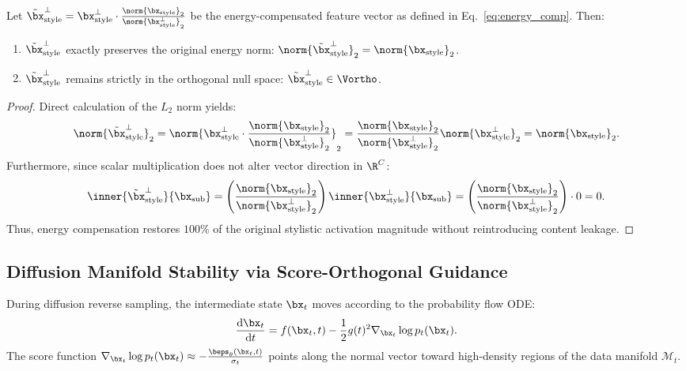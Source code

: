 \begin{theorem}
\label{thm:energy}
Let $\tilde{\bx}_{\text{style}}^\perp = \bx_{\text{style}}^\perp \cdot \frac{\norm{\bx_{\text{style}}}_2}{\norm{\bx_{\text{style}}^\perp}_2}$ be the energy-compensated feature vector as defined in Eq.~\eqref{eq:energy_comp}. Then:
\begin{enumerate}
    \item $\tilde{\bx}_{\text{style}}^\perp$ exactly preserves the original energy norm: $\norm{\tilde{\bx}_{\text{style}}^\perp}_2 = \norm{\bx_{\text{style}}}_2$.
    \item $\tilde{\bx}_{\text{style}}^\perp$ remains strictly in the orthogonal null space: $\tilde{\bx}_{\text{style}}^\perp \in \Vortho$.
\end{enumerate}
\end{theorem}

\begin{proof}
Direct calculation of the $L_2$ norm yields:
\begin{equation}
    \norm{\tilde{\bx}_{\text{style}}^\perp}_2 = \norm{ \bx_{\text{style}}^\perp \cdot \frac{\norm{\bx_{\text{style}}}_2}{\norm{\bx_{\text{style}}^\perp}_2} }_2 = \frac{\norm{\bx_{\text{style}}}_2}{\norm{\bx_{\text{style}}^\perp}_2} \norm{\bx_{\text{style}}^\perp}_2 = \norm{\bx_{\text{style}}}_2.
\end{equation}
Furthermore, since scalar multiplication does not alter vector direction in $\R^C$:
\begin{equation}
    \inner{\tilde{\bx}_{\text{style}}^\perp}{\bx_{\text{sub}}} = \left( \frac{\norm{\bx_{\text{style}}}_2}{\norm{\bx_{\text{style}}^\perp}_2} \right) \inner{\bx_{\text{style}}^\perp}{\bx_{\text{sub}}} = \left( \frac{\norm{\bx_{\text{style}}}_2}{\norm{\bx_{\text{style}}^\perp}_2} \right) \cdot 0 = 0.
\end{equation}
Thus, energy compensation restores $100\%$ of the original stylistic activation magnitude without reintroducing content leakage.
\end{proof}

\subsection{Diffusion Manifold Stability via Score-Orthogonal Guidance}
\label{subsec:proof_manifold}

During diffusion reverse sampling, the intermediate state $\bx_t$ moves according to the probability flow ODE:
\begin{equation}
    \frac{\mathrm{d}\bx_t}{\mathrm{d}t} = f(\bx_t, t) - \frac{1}{2} g(t)^2 \nabla_{\bx_t} \log p_t(\bx_t).
\end{equation}
The score function $\nabla_{\bx_t} \log p_t(\bx_t) \approx -\frac{\beps_\theta(\bx_t, t)}{\sigma_t}$ points along the normal vector toward high-density regions of the data manifold $\mathcal{M}_t$.

